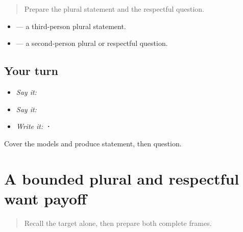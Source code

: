 \label{lesson:PA-C189-frame-contrast}



\begin{quote}
Prepare the plural statement and the respectful question.
\end{quote}

\begin{grammarlens}[title={Grammar Lens: same target, different frame endings}]
\begin{itemize}
\raggedright
  \item \textbf{    } — a third-person plural statement.
  \item \textbf{    } — a second-person plural or respectful question.
\end{itemize}
\end{grammarlens}

\subsection*{Your turn}
\begin{itemize}
\raggedright
  \item \emph{Say it:} \textbf{    }
  \item \emph{Say it:} \textbf{    }
  \item \emph{Write it:} \textbf{  ·  }
\end{itemize}

\begin{tcolorbox}[breakable,colback=teal!4,colframe=teal!35!black,title={Before you move on}]
Cover the models and produce statement, then question.
\end{tcolorbox}
\section[\texorpdfstring{\pa{ਉਹ} \pa{ਕੰਮ} \pa{ਕਰਨਾ} \pa{ਚਾਹੁੰਦੇ} … (oh kamm karnaa …)}{ਉਹ ਕੰਮ ਕਰਨਾ ਚਾਹੁੰਦੇ … (oh kamm karnaa …)}]{A bounded plural and respectful want payoff}

\label{lesson:PA-C189-payoff}



\begin{quote}
Recall the target alone, then prepare both complete frames.
\end{quote}

